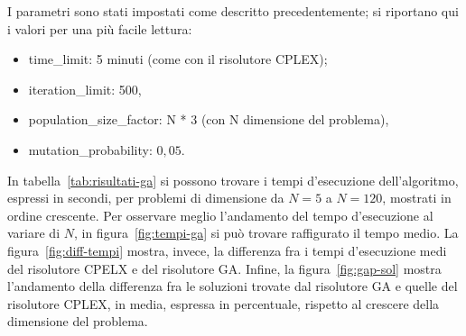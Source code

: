 I parametri sono stati impostati come descritto precedentemente; si riportano qui i valori per una più facile lettura:
\begin{itemize}
	\item \textsf{time\_limit}: 5 minuti (come con il risolutore CPLEX);
	\item \textsf{iteration\_limit}: 500,
	\item \textsf{population\_size\_factor}: N * 3 (con N dimensione del problema),
	\item \textsf{mutation\_probability}: $0,05$.
\end{itemize}
In tabella~\ref{tab:risultati-ga} si possono trovare i tempi d'esecuzione dell'algoritmo, espressi in secondi, per
problemi di dimensione da $N=5$ a $N=120$, mostrati in ordine crescente.
Per osservare meglio l'andamento del tempo d'esecuzione al variare di $N$, in figura~\ref{fig:tempi-ga}
si può trovare raffigurato il tempo medio.
La figura~\ref{fig:diff-tempi} mostra, invece, la differenza fra i tempi d'esecuzione medi del risolutore
CPELX e del risolutore GA.
Infine, la figura~\ref{fig:gap-sol} mostra l'andamento della differenza fra le soluzioni trovate
dal risolutore GA e quelle del risolutore CPLEX, in media, espressa in percentuale, rispetto
al crescere della dimensione del problema.
%
